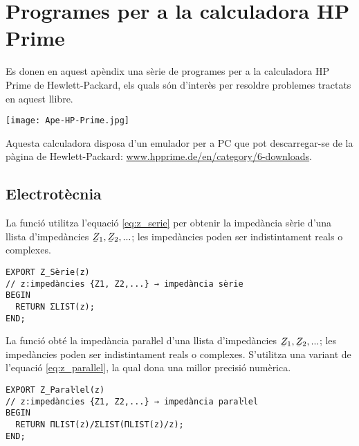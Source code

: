 \chapter{Programes per a la calculadora \textsf{HP Prime}}\label{sec:progs-HP}

\lstset{
	language=HPPRIME,
	basicstyle=\small\sf,
	numbers=left,
	frame=lines
}

Es donen en aquest apèndix una sèrie de programes per a la calculadora \textsf{HP Prime} de Hewlett-Packard, els quals són d'interès per resoldre problemes tractats en aquest llibre.

\begin{center}
\texttt{[image: Ape-HP-Prime.jpg]}
\end{center}

Aquesta calculadora disposa d'un emulador per a PC que pot descarregar-se de la pàgina de Hewlett-Packard: \href{http://www.hpprime.de/en/category/6-downloads}{www.hpprime.de/en/category/6-downloads}.

\section{Electrotècnia}\label{sec:HP_ELC}

La funció  utilitza l'equació \eqref{eq:z_serie} per obtenir la impedància sèrie d'una llista d'impedàncies $\cmplx{Z}_1, \cmplx{Z}_2, ...$; les impedàncies poden ser indistintament reals o complexes.

\begin{lstlisting}[caption={HP Prime --- Funció Z\_Sèrie}]
EXPORT Z_Sèrie(z)
// z:impedàncies {Z1, Z2,...} → impedància sèrie
BEGIN
  RETURN ΣLIST(z);
END;
\end{lstlisting}

La funció  obté la impedància paraŀlel  d'una llista d'impedàncies $\cmplx{Z}_1, \cmplx{Z}_2, ...$; les impedàncies poden ser indistintament reals o complexes. S'utilitza una variant de l'equació \eqref{eq:z_parallel}, la qual dona una millor precisió numèrica.

\begin{lstlisting}[caption={HP Prime --- Funció Z\_Paraŀlel}]
EXPORT Z_Paraŀlel(z)
// z:impedàncies {Z1, Z2,...} → impedància paraŀlel
BEGIN
  RETURN ΠLIST(z)/ΣLIST(ΠLIST(z)/z);
END;
\end{lstlisting}

